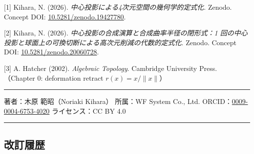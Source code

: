 \documentclass[
]{ltjsarticle}
\begin{document}
{[}1{]} Kihara, N. (2026).
\emph{中心投影による4次元空間の幾何学的定式化}. Zenodo. Concept DOI:
\href{https://doi.org/10.5281/zenodo.19427780}{10.5281/zenodo.19427780}.

{[}2{]} Kihara, N. (2026).
\emph{中心投影の合成演算と合成曲率半径の閉形式：1
回の中心投影と球面上の可換切断による高次元削減の代数的定式化}. Zenodo.
Concept DOI:
\href{https://doi.org/10.5281/zenodo.20060728}{10.5281/zenodo.20060728}.

{[}3{]} A. Hatcher (2002). \emph{Algebraic Topology}. Cambridge
University Press. （Chapter 0: deformation retract \(r(x) = x/\|x\|\)）

\begin{center}\rule{0.5\linewidth}{0.5pt}\end{center}

著者：木原 範昭（Noriaki Kihara） 所属：WF System Co., Ltd.
ORCID：\href{https://orcid.org/0009-0004-6753-4020}{0009-0004-6753-4020}
ライセンス：CC BY 4.0

\begin{center}\rule{0.5\linewidth}{0.5pt}\end{center}

\subsection{改訂履歴}\label{ux6539ux8a02ux5c65ux6b74}
\end{document}
